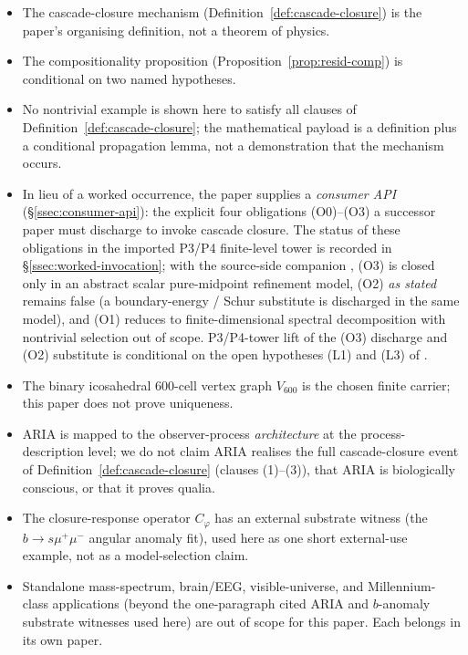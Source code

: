 \documentclass[11pt]{article}
\theoremstyle{definition}
\newcommand{\pphi}{\varphi}
\newcommand{\Vsub}{V_{600}}
\newcommand{\Cphi}{C_{\pphi}}
\begin{document}
\begin{tcolorbox}[title=\textbf{Epistemic status (read first)}]
\begin{itemize}[leftmargin=*]
\item The cascade-closure mechanism (Definition~\ref{def:cascade-closure})
  is the paper's organising definition, not a theorem of physics.
\item The compositionality proposition (Proposition~\ref{prop:resid-comp})
  is conditional on two named hypotheses.
\item No nontrivial example is shown here to satisfy all clauses of
  Definition~\ref{def:cascade-closure}; the mathematical payload is
  a definition plus a conditional propagation lemma, not a
  demonstration that the mechanism occurs.
\item In lieu of a worked occurrence, the paper supplies a
  \emph{consumer API} (\S\ref{ssec:consumer-api}): the explicit
  four obligations (O0)--(O3) a successor paper must discharge to
  invoke cascade closure. The status of these obligations in the
  imported P3/P4 finite-level tower is recorded in
  \S\ref{ssec:worked-invocation}; with the source-side companion
  \cite{CascadeRefinementCompat}, (O3) is closed only in an
  abstract scalar pure-midpoint refinement model, (O2) \emph{as
  stated} remains false (a boundary-energy / Schur substitute is
  discharged in the same model), and (O1) reduces to finite-dimensional
  spectral decomposition with nontrivial selection out of scope.
  P3/P4-tower lift of the (O3) discharge and (O2) substitute is
  conditional on the open hypotheses (L1) and (L3) of
  \cite[\S\texttt{sec:scope-and-gap}]{CascadeRefinementCompat}.
\item The binary icosahedral 600-cell vertex graph $\Vsub$ is the chosen
  finite carrier; this paper does not prove uniqueness.
\item ARIA is mapped to the observer-process \emph{architecture} at
  the process-description level; we do not claim ARIA realises the
  full cascade-closure event of Definition~\ref{def:cascade-closure}
  (clauses (1)--(3)), that ARIA is biologically conscious, or that it
  proves qualia.
\item The closure-response operator $\Cphi$ has an external substrate
  witness (the \(b\to s\mu^+\mu^-\) angular anomaly fit), used here
  as one short external-use example, not as a model-selection claim.
\item Standalone mass-spectrum, brain/EEG, visible-universe, and
  Millennium-class applications (beyond the one-paragraph cited
  ARIA and $b$-anomaly substrate witnesses used here) are out of
  scope for this paper. Each belongs in its own paper.
\end{itemize}
\end{tcolorbox}
\end{document}
